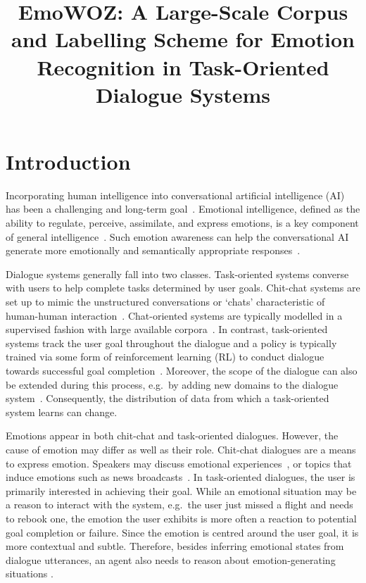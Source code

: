 \documentclass[10pt, a4paper]{article}
\title{EmoWOZ: A Large-Scale Corpus and Labelling Scheme for Emotion Recognition in Task-Oriented Dialogue Systems}
\begin{document}
\maketitleabstract

\section{Introduction}
Incorporating human intelligence into conversational artificial intelligence (AI) has been a challenging and long-term goal~\cite{Picard97}. Emotional intelligence, defined as the ability to regulate, perceive, assimilate, and express emotions, is a key component of general intelligence~\cite{MAYER1999267}. Such emotion awareness can help the conversational AI generate more emotionally and semantically appropriate responses~\cite{10.5555/3504035.3504125}.\par

Dialogue systems generally fall into two classes. Task-oriented systems converse with users to help complete tasks determined by user goals. Chit-chat systems are set up to mimic the unstructured conversations or ‘chats’ characteristic of human-human interaction~\cite{10.5555/1214993}. Chat-oriented systems are typically modelled in a supervised fashion with large available corpora~\cite{vinyal-etal-2015}. In contrast, task-oriented systems track the user goal throughout the dialogue and a policy is typically trained via some form of reinforcement learning (RL) to conduct dialogue towards successful goal completion~\cite{young2002talking}. Moreover, the scope of the dialogue can also be extended during this process, e.g.\ by adding new domains to the dialogue system~\cite{madotto-etal-2021-continual}. Consequently, the distribution of data from which a task-oriented system learns can change.

Emotions appear in both chit-chat and task-oriented dialogues. However, the cause of emotion may differ as well as their role. Chit-chat dialogues are a means to express emotion. Speakers may discuss emotional experiences~\cite{li-etal-2017-dailydialog}, or topics that induce emotions such as news broadcasts~\cite{8273582}. In task-oriented dialogues, the user is primarily interested in achieving their goal. While an emotional situation may be a reason to interact with the system, e.g.\ the user just missed a flight and needs to rebook one, the emotion the user exhibits is more often a reaction to potential goal completion or failure. Since the emotion is centred around the user goal, it is more contextual and subtle. Therefore, besides inferring emotional states from dialogue utterances, an agent also needs to reason about emotion-generating situations \cite{Poria2021}. \par 
\end{document}
